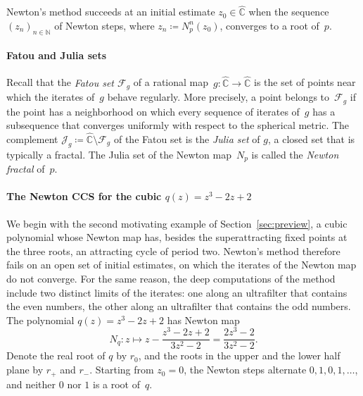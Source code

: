 \documentclass[psamsfonts]{amsart}
\theoremstyle{definition}
\theoremstyle{remark}
\newcommand{\hatC}{\hat{\mathbb{C}}}
\numberwithin{equation}{section}
\begin{document}
Newton’s method succeeds at an initial estimate $z_0\in\hatC$ when the sequence $(z_n)_{n\in \mathbb{N}}$ of Newton steps, where $z_n \coloneqq N_p^n(z_0)$, converges to a root of~$p$.

\paragraph{Fatou and Julia sets}
Recall that the \emph{Fatou set $\mathcal{F}_g$} of a rational map~$g\colon\hatC\to\hatC$ is the set of points near which the iterates of~$g$ behave regularly.
More precisely, a point belongs to~$\mathcal{F}_g$ if the point has a neighborhood on which every sequence of iterates of~$g$ has a subsequence that converges uniformly with respect to the spherical metric.
The complement $\mathcal{J}_g\coloneqq\hatC\setminus \mathcal{F}_g$ of the Fatou set is the \emph{Julia set} of $g$, a closed set that is typically a fractal.
The Julia set of the Newton map~$N_p$ is called the \emph{Newton fractal} of~$p$.

\paragraph{The Newton CCS for the cubic $q(z) = z^3-2z+2$}
\label{sec:Newton-cubic}
We begin with the second motivating example of Section~\ref{sec:preview}, a cubic polynomial whose Newton map has, besides the superattracting fixed points at the three roots, an attracting cycle of period two.
Newton's method therefore fails on an open set of initial estimates, on which the iterates of the Newton map do not converge.
For the same reason, the deep computations of the method include two distinct limits of the iterates: one along an ultrafilter that contains the even numbers, the other along an ultrafilter that contains the odd numbers.
The polynomial $q(z) = z^3-2z+2$ has Newton map
\begin{equation*}
N_q: z \mapsto z - \frac{z^3-2z+2}{3z^2-2} = \frac{2z^3-2}{3z^2-2}.
\end{equation*}
Denote the real root of $q$ by $r_0$, and the roots in the upper and the lower half plane by $r_{+}$ and $r_{-}$.
Starting from $z_0=0$, the Newton steps alternate $0, 1, 0, 1, \dots$, and neither $0$ nor $1$ is a root of~$q$.
\end{document}

